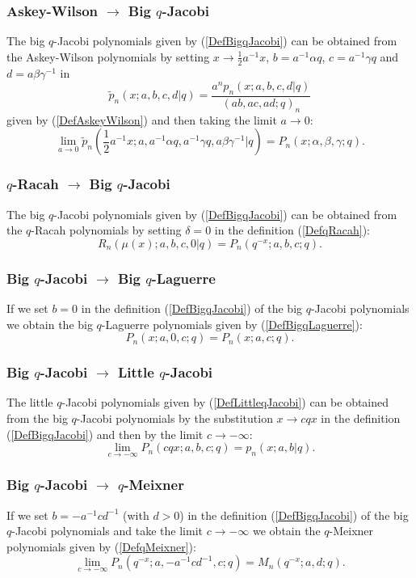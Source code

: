 \documentclass[envcountchap,graybox]{svmono}
\newcounter{rom}
\begin{document}
\subsubsection*{Askey-Wilson $\rightarrow$ Big $q$-Jacobi}
The big $q$-Jacobi polynomials given by (\ref{DefBigqJacobi}) can be obtained from the
Askey-Wilson polynomials by setting $x\rightarrow \frac{1}{2}a^{-1}x$, $b=a^{-1}\alpha q$,
$c=a^{-1}\gamma q$ and $d=a\beta \gamma^{-1}$ in
$${\tilde p}_n(x;a,b,c,d|q)=\frac{a^np_n(x;a,b,c,d|q)}{(ab,ac,ad;q)_n}$$
given by (\ref{DefAskeyWilson}) and then taking the limit $a\rightarrow 0$:
$$\lim_{a\rightarrow 0}{\tilde p}_n(\textstyle\frac{1}{2}a^{-1}x;a,a^{-1}\alpha q,
a^{-1}\gamma q,a\beta \gamma^{-1}|q)=P_n(x;\alpha,\beta,\gamma;q).$$

\subsubsection*{$q$-Racah $\rightarrow$ Big $q$-Jacobi}
The big $q$-Jacobi polynomials given by (\ref{DefBigqJacobi}) can be obtained
from the $q$-Racah polynomials by setting $\delta=0$ in the definition
(\ref{DefqRacah}):
$$R_n(\mu(x);a,b,c,0|q)=P_n(q^{-x};a,b,c;q).$$

\subsubsection*{Big $q$-Jacobi $\rightarrow$ Big $q$-Laguerre}
If we set $b=0$ in the definition (\ref{DefBigqJacobi}) of
the big $q$-Jacobi polynomials we obtain the big $q$-Laguerre
polynomials given by (\ref{DefBigqLaguerre}):
\begin{equation}
P_n(x;a,0,c;q)=P_n(x;a,c;q).
\end{equation}

\subsubsection*{Big $q$-Jacobi $\rightarrow$ Little $q$-Jacobi}
The little $q$-Jacobi polynomials given by (\ref{DefLittleqJacobi}) can be obtained
from the big $q$-Jacobi polynomials by the substitution $x\rightarrow cqx$ in the definition
(\ref{DefBigqJacobi}) and then by the limit $c\rightarrow -\infty$:
\begin{equation}
\lim_{c\rightarrow -\infty}P_n(cqx;a,b,c;q)=p_n(x;a,b|q).
\end{equation}

\subsubsection*{Big $q$-Jacobi $\rightarrow$ $q$-Meixner}
If we set $b=-a^{-1}cd^{-1}$ (with $d>0$) in the definition (\ref{DefBigqJacobi})
of the big $q$-Jacobi polynomials and take the limit $c\rightarrow -\infty$ we
obtain the $q$-Meixner polynomials given by (\ref{DefqMeixner}):
\begin{equation}
\lim_{c\rightarrow -\infty}P_n(q^{-x};a,-a^{-1}cd^{-1},c;q)=M_n(q^{-x};a,d;q).
\end{equation}
\end{document}
